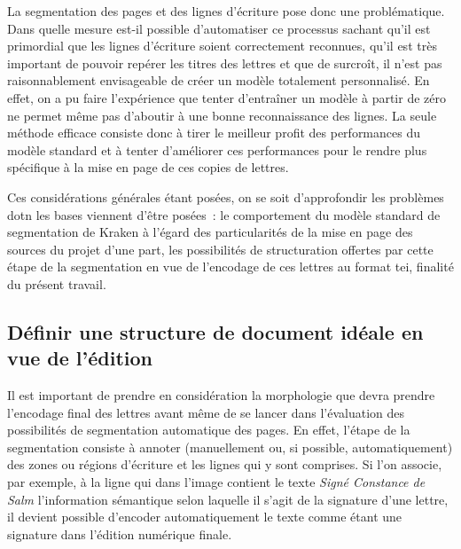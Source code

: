 \documentclass[a4paper,12pt,twoside]{book}
\begin{document}
				La segmentation des pages et des lignes d'écriture pose donc une problématique. Dans quelle mesure est-il possible d'automatiser ce processus sachant qu'il est primordial que les lignes d'écriture soient correctement reconnues, qu'il est très important de pouvoir repérer les titres des lettres et que de surcroît, il n'est pas raisonnablement envisageable de créer un modèle totalement personnalisé. En effet, on a pu faire l'expérience que tenter d'entraîner un modèle à partir de zéro ne permet même pas d'aboutir à une bonne reconnaissance des lignes. La seule méthode efficace consiste donc à tirer le meilleur profit des performances du modèle standard et à tenter d'améliorer ces performances pour le rendre plus spécifique à la mise en page de ces copies de lettres.
				
				Ces considérations générales étant posées, on se soit d'approfondir les problèmes dotn les bases viennent d'être posées~: le comportement du modèle standard de segmentation de Kraken à l'égard des particularités de la mise en page des sources du projet d'une part, les possibilités de structuration offertes par cette étape de la segmentation en vue de l'encodage de ces lettres au format \gls{tei}, finalité du présent travail.
					
			\subsection{Définir une structure de document idéale en vue de l'édition}
				Il est important de prendre en considération la morphologie que devra prendre l'encodage final des lettres avant même de se lancer dans l'évaluation des possibilités de segmentation automatique des pages. En effet, l'étape de la segmentation consiste à annoter (manuellement ou, si possible, automatiquement) des zones ou régions d'écriture et les lignes qui y sont comprises. Si l'on associe, par exemple, à la ligne qui dans l'image contient le texte \textit{Signé Constance de Salm} l'information sémantique selon laquelle il s'agit de la signature d'une lettre, il devient possible d'encoder automatiquement le texte comme étant une signature dans l'édition numérique finale.
				
\end{document}
